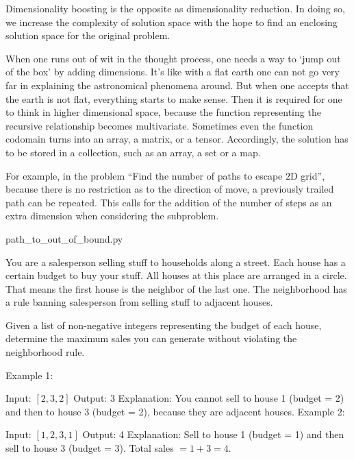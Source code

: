 Dimensionality boosting is the opposite as dimensionality reduction.
In doing so, we increase the complexity of solution space with the hope to find an enclosing
solution space for the original problem.

When one runs out of wit in the thought process, one needs a way to `jump out of the
box' by adding dimensions.
It's like with a flat earth one can not go very far in explaining the astronomical phenomena
around.
But when one accepts that the earth is not flat, everything starts to make sense.
Then it is required for one to think in higher dimensional space, because the function
representing the recursive relationship becomes multivariate.
Sometimes even the function codomain turns into an array, a matrix, or a tensor.
Accordingly, the solution has to be stored in a collection, such as an array, a set or a map.

For example, in the problem ``Find the number of paths to escape $2$D grid'', because there is no
restriction as to the direction of move, a previously trailed path can be repeated.
This calls for the addition of the number of steps as an extra dimension when considering the
subproblem.

\begin{clisting}
    
    {path_to_out_of_bound.py}
\end{clisting}



You are a salesperson selling stuff to households along a street.
Each house has a certain budget to buy your stuff.
All houses at this place are arranged in a circle.
That means the first house is the neighbor of the last one.
The neighborhood has a rule banning salesperson from selling stuff to adjacent houses.

Given a list of non-negative integers representing the budget of each house, determine
the maximum sales you can generate without violating the neighborhood rule.

Example 1:

Input: $[2,3,2]$
Output: 3
Explanation: You cannot sell to house 1 (budget = 2) and then to house 3 (budget = 2),
because they are adjacent houses.
Example 2:

Input: $[1,2,3,1]$
Output: 4
Explanation: Sell to house 1 (budget = 1) and then sell to house 3 (budget = 3).
Total sales $= 1 + 3 = 4.$


